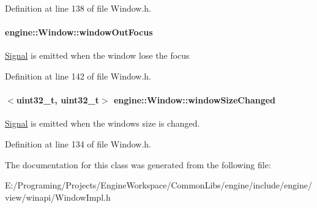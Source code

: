 Definition at line 138 of file Window.\+h.

\paragraph[{\texorpdfstring{window\+Out\+Focus}{windowOutFocus}}]{ engine\+::\+Window\+::window\+Out\+Focus\hspace{0.3cm}{\ttfamily [inherited]}}\hypertarget{a00082_af6f8cc0d616685683d5c6b52b4cc07d0}{}\label{a00082_af6f8cc0d616685683d5c6b52b4cc07d0}
\hyperlink{a00065}{Signal} is emitted when the window lose the focus 

Definition at line 142 of file Window.\+h.

\paragraph[{\texorpdfstring{window\+Size\+Changed}{windowSizeChanged}}]{$<$uint32\+\_\+t, uint32\+\_\+t$>$ engine\+::\+Window\+::window\+Size\+Changed\hspace{0.3cm}{\ttfamily [inherited]}}\hypertarget{a00082_a20978a09b8843aa8960dc9d3a989b11a}{}\label{a00082_a20978a09b8843aa8960dc9d3a989b11a}
\hyperlink{a00065}{Signal} is emitted when the window\textquotesingle{}s size is changed. 

Definition at line 134 of file Window.\+h.



The documentation for this class was generated from the following file\+:\begin{DoxyCompactItemize}
\item 
E\+:/\+Programing/\+Projects/\+Engine\+Workspace/\+Common\+Libs/engine/include/engine/view/winapi/Window\+Impl.\+h\end{DoxyCompactItemize}
